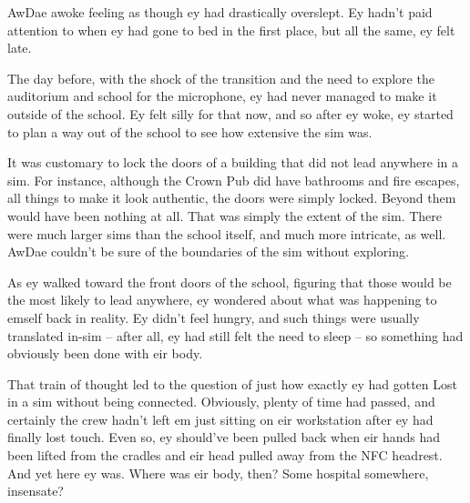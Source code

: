 AwDae awoke feeling as though ey had drastically overslept.  Ey hadn't paid attention to when ey had gone to bed in the first place, but all the same, ey felt late.

The day before, with the shock of the transition and the need to explore the auditorium and school for the microphone, ey had never managed to make it outside of the school.  Ey felt silly for that now, and so after ey woke, ey started to plan a way out of the school to see how extensive the sim was.

It was customary to lock the doors of a building that did not lead anywhere in a sim.  For instance, although the Crown Pub did have bathrooms and fire escapes, all things to make it look authentic, the doors were simply locked.  Beyond them would have been nothing at all.  That was simply the extent of the sim.  There were much larger sims than the school itself, and much more intricate, as well.  AwDae couldn't be sure of the boundaries of the sim without exploring.

As ey walked toward the front doors of the school, figuring that those would be the most likely to lead anywhere, ey wondered about what was happening to emself back in reality.  Ey didn't feel hungry, and such things were usually translated in-sim -- after all, ey had still felt the need to sleep -- so something had obviously been done with eir body.

That train of thought led to the question of just how exactly ey had gotten Lost in a sim without being connected.  Obviously, plenty of time had passed, and certainly the crew hadn't left em just sitting on eir workstation after ey had finally lost touch.  Even so, ey should've been pulled back when eir hands had been lifted from the cradles and eir head pulled away from the NFC headrest.  And yet here ey was.  Where was eir body, then?  Some hospital somewhere, insensate?
